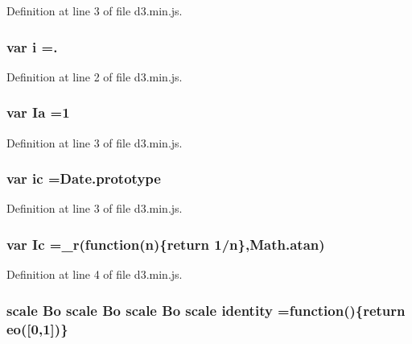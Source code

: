 Definition at line 3 of file d3.\+min.\+js.

\subsubsection[{i}]{\setlength{\rightskip}{0pt plus 5cm}var {\bf i} =.}\label{d3_8min_8js_a5e25b1d1bed9ab5f3174b76d6a722180}


Definition at line 2 of file d3.\+min.\+js.

\subsubsection[{Ia}]{\setlength{\rightskip}{0pt plus 5cm}var Ia =1}\label{d3_8min_8js_adbd8c6805cfaa3b184124f6f205dc1b7}


Definition at line 3 of file d3.\+min.\+js.

\subsubsection[{ic}]{\setlength{\rightskip}{0pt plus 5cm}var ic ={\bf Date.\+prototype}}\label{d3_8min_8js_a5c0af378526a415ea2a3a124705a88c0}


Definition at line 3 of file d3.\+min.\+js.

\subsubsection[{Ic}]{\setlength{\rightskip}{0pt plus 5cm}var Ic ={\bf \+\_\+r}(function({\bf n})\{{\bf return} 1/{\bf n}\},Math.\+atan)}\label{d3_8min_8js_aebef256c336912c2f79de07e7bcc547d}


Definition at line 4 of file d3.\+min.\+js.

\subsubsection[{identity}]{ {\bf scale} {\bf Bo} {\bf scale} {\bf Bo} {\bf scale} {\bf Bo} {\bf scale} identity =function()\{{\bf return} {\bf eo}([0,1])\}}\label{d3_8min_8js_af6b63305de62c5ed845e742d10bedcb8}


